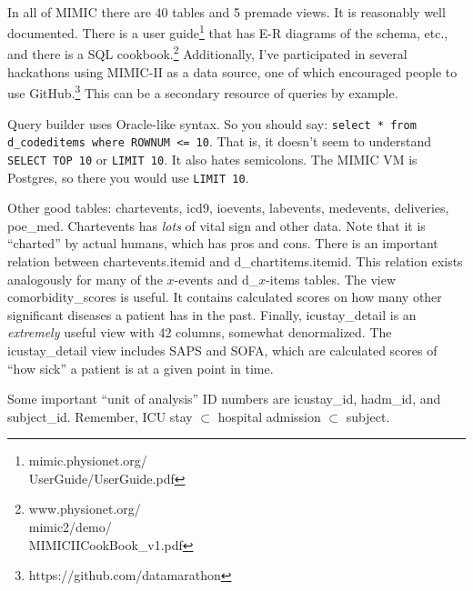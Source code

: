 \documentclass{tufte-handout}
\begin{document}
~\\

In all of MIMIC there are 40 tables and 5 premade views. It is
reasonably well documented. There is a user
guide\footnote{mimic.physionet.org/\\UserGuide/UserGuide.pdf} that has
E-R diagrams of the schema, etc., and there is a SQL
cookbook.\footnote{www.physionet.org/\\mimic2/demo/\\MIMICIICookBook\_v1.pdf}
Additionally, I've participated in several hackathons using MIMIC-II
as a data source, one of which encouraged people to use
GitHub.\footnote{https://github.com/datamarathon} This can be a
secondary resource of queries by example.

Query builder uses Oracle-like syntax. So you should say:
\texttt{select * from d\_codeditems where ROWNUM <= 10}. That is, it
doesn't seem to understand \texttt{SELECT TOP 10} or \texttt{LIMIT
  10}. It also hates semicolons. The MIMIC VM is Postgres, so there
you would use \texttt{LIMIT 10}. 

Other good tables: chartevents, icd9, ioevents, labevents, medevents,
deliveries, poe\_med. Chartevents has \emph{lots} of vital sign and
other data. Note that it is ``charted'' by actual humans, which has
pros and cons. There is an important relation between
chartevents.itemid and d\_chartitems.itemid. This relation exists
analogously for many of the $x$-events and d\_$x$-items tables. The
view comorbidity\_scores is useful. It contains calculated scores on
how many other significant diseases a patient has in the past.
Finally, icustay\_detail is an \emph{extremely} useful view with 42
columns, somewhat denormalized. The icustay\_detail view includes SAPS
and SOFA, which are calculated scores of ``how sick'' a patient is at
a given point in time.

Some important ``unit of analysis'' ID numbers are icustay\_id,
hadm\_id, and subject\_id. Remember, ICU stay $\subset$ hospital
admission $\subset$ subject. 
\end{document}
